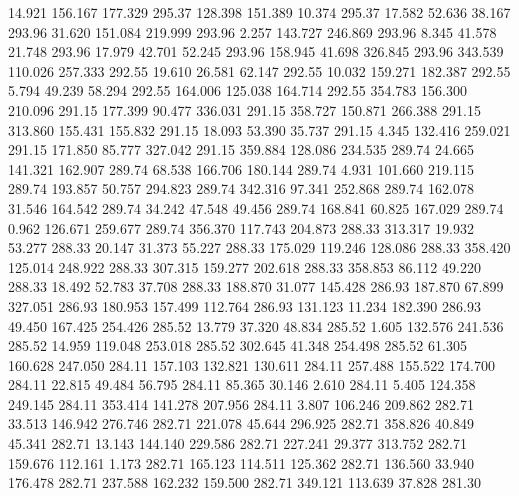   14.921  156.167  177.329       295.37
 128.398  151.389   10.374       295.37
  17.582   52.636   38.167       293.96
  31.620  151.084  219.999       293.96
   2.257  143.727  246.869       293.96
   8.345   41.578   21.748       293.96
  17.979   42.701   52.245       293.96
 158.945   41.698  326.845       293.96
 343.539  110.026  257.333       292.55
  19.610   26.581   62.147       292.55
  10.032  159.271  182.387       292.55
   5.794   49.239   58.294       292.55
 164.006  125.038  164.714       292.55
 354.783  156.300  210.096       291.15
 177.399   90.477  336.031       291.15
 358.727  150.871  266.388       291.15
 313.860  155.431  155.832       291.15
  18.093   53.390   35.737       291.15
   4.345  132.416  259.021       291.15
 171.850   85.777  327.042       291.15
 359.884  128.086  234.535       289.74
  24.665  141.321  162.907       289.74
  68.538  166.706  180.144       289.74
   4.931  101.660  219.115       289.74
 193.857   50.757  294.823       289.74
 342.316   97.341  252.868       289.74
 162.078   31.546  164.542       289.74
  34.242   47.548   49.456       289.74
 168.841   60.825  167.029       289.74
   0.962  126.671  259.677       289.74
 356.370  117.743  204.873       288.33
 313.317   19.932   53.277       288.33
  20.147   31.373   55.227       288.33
 175.029  119.246  128.086       288.33
 358.420  125.014  248.922       288.33
 307.315  159.277  202.618       288.33
 358.853   86.112   49.220       288.33
  18.492   52.783   37.708       288.33
 188.870   31.077  145.428       286.93
 187.870   67.899  327.051       286.93
 180.953  157.499  112.764       286.93
 131.123   11.234  182.390       286.93
  49.450  167.425  254.426       285.52
  13.779   37.320   48.834       285.52
   1.605  132.576  241.536       285.52
  14.959  119.048  253.018       285.52
 302.645   41.348  254.498       285.52
  61.305  160.628  247.050       284.11
 157.103  132.821  130.611       284.11
 257.488  155.522  174.700       284.11
  22.815   49.484   56.795       284.11
  85.365   30.146    2.610       284.11
   5.405  124.358  249.145       284.11
 353.414  141.278  207.956       284.11
   3.807  106.246  209.862       282.71
  33.513  146.942  276.746       282.71
 221.078   45.644  296.925       282.71
 358.826   40.849   45.341       282.71
  13.143  144.140  229.586       282.71
 227.241   29.377  313.752       282.71
 159.676  112.161    1.173       282.71
 165.123  114.511  125.362       282.71
 136.560   33.940  176.478       282.71
 237.588  162.232  159.500       282.71
 349.121  113.639   37.828       281.30
